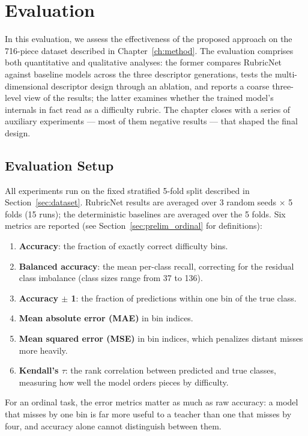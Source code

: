 \chapter{Evaluation}
\label{ch:evaluation}

In this evaluation, we assess the effectiveness of the proposed approach on the 716-piece dataset described in Chapter~\ref{ch:method}. The evaluation comprises both quantitative and qualitative analyses: the former compares RubricNet against baseline models across the three descriptor generations, tests the multi-dimensional descriptor design through an ablation, and reports a coarse three-level view of the results; the latter examines whether the trained model's internals in fact read as a difficulty rubric. The chapter closes with a series of auxiliary experiments --- most of them negative results --- that shaped the final design.

\section{Evaluation Setup}
\label{sec:eval_setup}
All experiments run on the fixed stratified 5-fold split described in Section~\ref{sec:dataset}. RubricNet results are averaged over 3 random seeds $\times$ 5 folds (15 runs); the deterministic baselines are averaged over the 5 folds. Six metrics are reported (see Section~\ref{sec:prelim_ordinal} for definitions):
\begin{enumerate}
    \item \textbf{Accuracy}: the fraction of exactly correct difficulty bins.
    \item \textbf{Balanced accuracy}: the mean per-class recall, correcting for the residual class imbalance (class sizes range from 37 to 136).
    \item \textbf{Accuracy $\pm$ 1}: the fraction of predictions within one bin of the true class.
    \item \textbf{Mean absolute error (MAE)} in bin indices.
    \item \textbf{Mean squared error (MSE)} in bin indices, which penalizes distant misses more heavily.
    \item \textbf{Kendall's $\tau$}: the rank correlation between predicted and true classes, measuring how well the model orders pieces by difficulty.
\end{enumerate}
For an ordinal task, the error metrics matter as much as raw accuracy: a model that misses by one bin is far more useful to a teacher than one that misses by four, and accuracy alone cannot distinguish between them.

